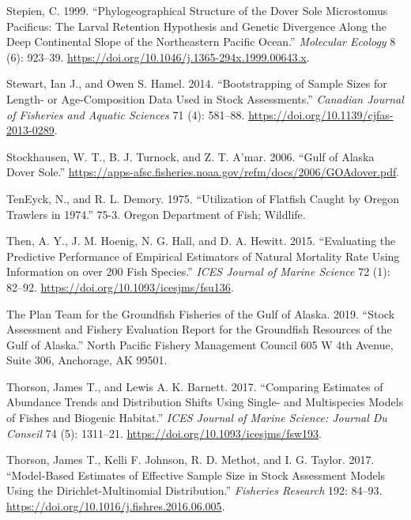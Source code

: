 \documentclass[11pt,
  english,
  a4paper,
]{article}
\begin{document}
\begin{cslreferences}
\leavevmode\hypertarget{ref-stepien_phylogeographical_1999}{}%
Stepien, C. 1999. ``Phylogeographical Structure of the Dover Sole Microstomus Pacificus: The Larval Retention Hypothesis and Genetic Divergence Along the Deep Continental Slope of the Northeastern Pacific Ocean.'' \emph{Molecular Ecology} 8 (6): 923--39. \url{https://doi.org/10.1046/j.1365-294x.1999.00643.x}.

\leavevmode\hypertarget{ref-stewart_bootstrapping_2014}{}%
Stewart, Ian J., and Owen S. Hamel. 2014. ``Bootstrapping of Sample Sizes for Length- or Age-Composition Data Used in Stock Assessments.'' \emph{Canadian Journal of Fisheries and Aquatic Sciences} 71 (4): 581--88. \url{https://doi.org/10.1139/cjfas-2013-0289}.

\leavevmode\hypertarget{ref-stockhausen_gulf_2006}{}%
Stockhausen, W. T., B. J. Turnock, and Z. T. A'mar. 2006. ``Gulf of Alaska Dover Sole.'' \url{https://apps-afsc.fisheries.noaa.gov/refm/docs/2006/GOAdover.pdf}.

\leavevmode\hypertarget{ref-teneyck_utilization_1975}{}%
TenEyck, N., and R. L. Demory. 1975. ``Utilization of Flatfish Caught by Oregon Trawlers in 1974.'' 75-3. Oregon Department of Fish; Wildlife.

\leavevmode\hypertarget{ref-then_evaluating_2015}{}%
Then, A. Y., J. M. Hoenig, N. G. Hall, and D. A. Hewitt. 2015. ``Evaluating the Predictive Performance of Empirical Estimators of Natural Mortality Rate Using Information on over 200 Fish Species.'' \emph{ICES Journal of Marine Science} 72 (1): 82--92. \url{https://doi.org/10.1093/icesjms/fsu136}.

\leavevmode\hypertarget{ref-the_plan_team_for_the_groundfish_fisheries_of_the_gulf_of_alaska_stock_2019}{}%
The Plan Team for the Groundfish Fisheries of the Gulf of Alaska. 2019. ``Stock Assessment and Fishery Evaluation Report for the Groundfish Resources of the Gulf of Alaska.'' North Pacific Fishery Management Council 605 W 4th Avenue, Suite 306, Anchorage, AK 99501.

\leavevmode\hypertarget{ref-thorson_comparing_2017}{}%
Thorson, James T., and Lewis A. K. Barnett. 2017. ``Comparing Estimates of Abundance Trends and Distribution Shifts Using Single- and Multispecies Models of Fishes and Biogenic Habitat.'' \emph{ICES Journal of Marine Science: Journal Du Conseil} 74 (5): 1311--21. \url{https://doi.org/10.1093/icesjms/fsw193}.

\leavevmode\hypertarget{ref-thorson_model-based_2017}{}%
Thorson, James T., Kelli F. Johnson, R. D. Methot, and I. G. Taylor. 2017. ``Model-Based Estimates of Effective Sample Size in Stock Assessment Models Using the Dirichlet-Multinomial Distribution.'' \emph{Fisheries Research} 192: 84--93. \url{https://doi.org/10.1016/j.fishres.2016.06.005}.


\end{cslreferences}
\end{document}
